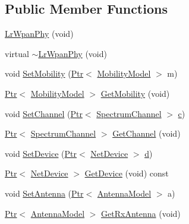 \subsection*{Public Member Functions}
\begin{DoxyCompactItemize}
\item 
\hyperlink{classns3_1_1LrWpanPhy_a93412f30a30d144978857a5205c55b7b}{Lr\+Wpan\+Phy} (void)
\item 
virtual \hyperlink{classns3_1_1LrWpanPhy_a569f77ccc57641af08e39e84aa2cc956}{$\sim$\+Lr\+Wpan\+Phy} (void)
\item 
void \hyperlink{classns3_1_1LrWpanPhy_a9cd1699d839197cd6f491ee14f17d14f}{Set\+Mobility} (\hyperlink{classns3_1_1Ptr}{Ptr}$<$ \hyperlink{classns3_1_1MobilityModel}{Mobility\+Model} $>$ m)
\item 
\hyperlink{classns3_1_1Ptr}{Ptr}$<$ \hyperlink{classns3_1_1MobilityModel}{Mobility\+Model} $>$ \hyperlink{classns3_1_1LrWpanPhy_a629b895fa092ea6b3e583ace5e6d8014}{Get\+Mobility} (void)
\item 
void \hyperlink{classns3_1_1LrWpanPhy_adc8fc0181c802576d065a6d05f7b29ae}{Set\+Channel} (\hyperlink{classns3_1_1Ptr}{Ptr}$<$ \hyperlink{classns3_1_1SpectrumChannel}{Spectrum\+Channel} $>$ \hyperlink{mmwave_2model_2fading-traces_2fading__trace__generator_8m_ae0323a9039add2978bf5b49550572c7c}{c})
\item 
\hyperlink{classns3_1_1Ptr}{Ptr}$<$ \hyperlink{classns3_1_1SpectrumChannel}{Spectrum\+Channel} $>$ \hyperlink{classns3_1_1LrWpanPhy_a48f002b2b7b19b76bd062686a6b9a3e4}{Get\+Channel} (void)
\item 
void \hyperlink{classns3_1_1LrWpanPhy_ad15349eb927b16cb23f36ad4adf8db77}{Set\+Device} (\hyperlink{classns3_1_1Ptr}{Ptr}$<$ \hyperlink{classns3_1_1NetDevice}{Net\+Device} $>$ \hyperlink{lte__pathloss_8m_a1aabac6d068eef6a7bad3fdf50a05cc8}{d})
\item 
\hyperlink{classns3_1_1Ptr}{Ptr}$<$ \hyperlink{classns3_1_1NetDevice}{Net\+Device} $>$ \hyperlink{classns3_1_1LrWpanPhy_ace242caabfdb950f3da22d4031ab0a50}{Get\+Device} (void) const 
\item 
void \hyperlink{classns3_1_1LrWpanPhy_af22ce300bde35f253d4eb101d8e731b9}{Set\+Antenna} (\hyperlink{classns3_1_1Ptr}{Ptr}$<$ \hyperlink{classns3_1_1AntennaModel}{Antenna\+Model} $>$ a)
\item 
\hyperlink{classns3_1_1Ptr}{Ptr}$<$ \hyperlink{classns3_1_1AntennaModel}{Antenna\+Model} $>$ \hyperlink{classns3_1_1LrWpanPhy_a1316975746fd64c36dd9631a45a3a0d6}{Get\+Rx\+Antenna} (void)
\item 

\end{DoxyCompactItemize}
